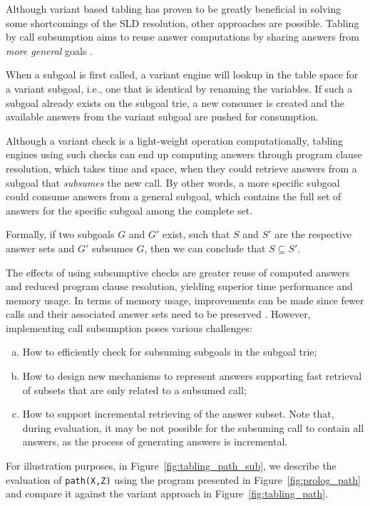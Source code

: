 Although variant based tabling has proven to be greatly beneficial in solving some shortcomings of the SLD resolution,
other approaches are possible. Tabling by call subsumption aims to reuse answer computations by sharing answers from
\textit{more general} goals \cite{Johnson-99}.

When a subgoal is first called, a variant engine will lookup in the table space for a variant subgoal, i.e.,
one that is identical by renaming the variables. If such a subgoal already exists on the subgoal trie, a new
consumer is created and the available answers from the variant subgoal are pushed for consumption.

Although a variant check is a light-weight operation computationally,
tabling engines using such checks can end up computing answers through program clause resolution, which takes time and space,
when they could retrieve answers from a subgoal that \textit{subsumes} the new call. By other words, a more specific subgoal
could consume answers from a general subgoal, which contains the full set of answers for the specific subgoal among the complete set.

Formally, if two subgoals $G$ and $G'$ exist, such that $S$ and $S'$ are the respective answer sets and
$G'$ subsumes $G$, then we can conclude that $S \subseteq S'$.

The effects of using subsumptive checks are greater reuse of computed answers and reduced program clause resolution, yielding
superior time performance and memory usage. In terms of memory usage, improvements can be made since fewer calls and their
associated answer sets need to be preserved \cite{Johnson-99}. However, implementing call subsumption poses various challenges:

\begin{enumerate}[(a)]
\item How to efficiently check for subsuming subgoals in the subgoal trie;
\item How to design new mechanisms to represent answers supporting fast retrieval of subsets that are only related to a subsumed call;
\item How to support incremental retrieving of the answer subset. Note that, during evaluation, it may be not possible for
the subsuming call to contain all answers, as the process of generating answers is incremental.
\end{enumerate}

For illustration purposes, in Figure~\ref{fig:tabling_path_sub}, we describe the evaluation of \texttt{path(X,Z)}
using the program presented in Figure~\ref{fig:prolog_path}
and compare it against the variant approach in Figure~\ref{fig:tabling_path}.


